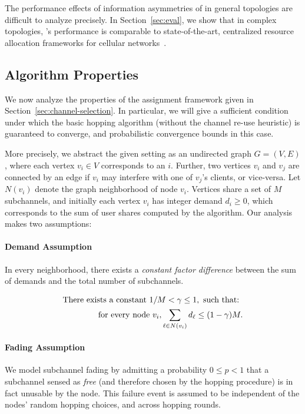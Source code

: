 The performance effects of information asymmetries of \cf in general topologies are difficult to analyze precisely. 
In Section~\ref{sec:eval},
we show that in complex topologies, \cf's performance is comparable to state-of-the-art, centralized resource allocation frameworks for cellular networks~\cite{fermi}.



\subsection{Algorithm Properties}
\label{sec:proof}
We now analyze the properties of the assignment framework given in Section~\ref{sec:channel-selection}. 
In particular, we will give a sufficient condition under which the basic hopping algorithm 
(without the channel re-use heuristic) is guaranteed to converge, 
and probabilistic convergence bounds in this case. 

More precisely, we abstract the given setting as an undirected graph $G = (V, E)$, where each vertex $v_i \in V$ corresponds to an \eNB $i$. 
Further, two vertices $v_i$ and $v_j$ are connected by an edge if $v_i$ may interfere with one of $v_j$'s clients, or vice-versa. 
Let $N(v_i)$ denote the graph neighborhood of node $v_i$. 
Vertices share a set of $M$ subchannels, and initially each vertex $v_i$ has integer demand $d_i \geq 0$, which corresponds to the sum of user shares computed by the algorithm. 
Our analysis makes two assumptions: 

 \paragraph{Demand Assumption} In every neighborhood, there exists a \emph{constant factor difference} between the sum of demands and the total number of  subchannels.

\begin{eqnarray*}
  \textnormal{There exists a constant } 1 / M < \gamma \leq 1, \textnormal{ such that: } \\ \textnormal{ for every node }  v_i, \sum_{\ell \in N(v_i)} d_\ell \leq (1 - \gamma) M.
\end{eqnarray*}

\paragraph{Fading Assumption} We model subchannel fading by admitting a probability $0 \leq p < 1$ that a subchannel sensed as \emph{free} (and therefore chosen by the hopping procedure) is in fact unusable by the node. 
This failure event is assumed to be independent of the nodes' random hopping choices, and across hopping rounds. 

